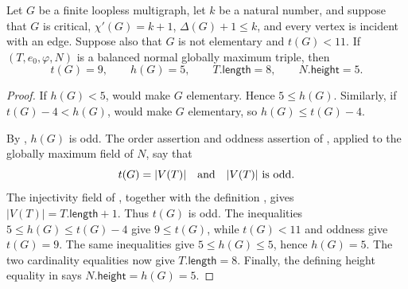 \begin{lemma}
Let $G$ be a finite loopless multigraph, let $k$ be a natural number, and
suppose that $G$ is critical, $\chi'(G)=k+1$, $\Delta(G)+1\leq k$, and
every vertex is incident with an edge.  Suppose also that $G$ is not
elementary and $t(G)<11$.  If $(T,e_0,\varphi,N)$ is a balanced normal
globally maximum triple, then
\[
 t(G)=9,\qquad h(G)=5,\qquad T.\mathsf{length}=8,
 \qquad N.\mathsf{height}=5.
\]
\end{lemma}
\begin{proof}
If $h(G)<5$,  would make $G$
elementary.  Hence $5\leq h(G)$.  Similarly, if
$t(G)-4<h(G)$,  would make $G$
elementary, so $h(G)\leq t(G)-4$.

By , $h(G)$ is odd.  The order assertion
and oddness assertion of , applied to
the globally maximum field of $N$, say that
\[
 t(G)=|V(T)|\quad\hbox{and}\quad |V(T)|\text{ is odd}.
\]
The injectivity field of , together with the
definition , gives
$|V(T)|=T.\mathsf{length}+1$.  Thus $t(G)$ is odd.  The inequalities
$5\leq h(G)\leq t(G)-4$ give $9\leq t(G)$, while $t(G)<11$ and oddness
give $t(G)=9$.  The same inequalities give $5\leq h(G)\leq5$, hence
$h(G)=5$.  The two cardinality equalities now give
$T.\mathsf{length}=8$.  Finally, the defining height equality in
 says
$N.\mathsf{height}=h(G)=5$.
\end{proof}
